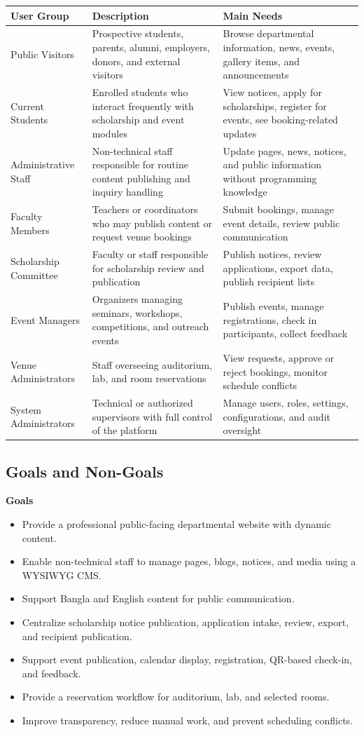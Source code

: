 \documentclass[12pt,a4paper]{article}
\newcommand{\thead}[1]{\textbf{\color{white}#1}}
\newcommand{\theadrow}{\rowcolor{headerblue}}
\begin{document}
\begin{longtable}{@{}L{3.6cm}L{5.2cm}L{5cm}@{}}
\theadrow \thead{User Group} & \thead{Description} & \thead{Main Needs} \\
\endhead
Public Visitors & Prospective students, parents, alumni, employers, donors, and external visitors & Browse departmental information, news, events, gallery items, and announcements \\
Current Students & Enrolled students who interact frequently with scholarship and event modules & View notices, apply for scholarships, register for events, see booking-related updates \\
Administrative Staff & Non-technical staff responsible for routine content publishing and inquiry handling & Update pages, news, notices, and public information without programming knowledge \\
Faculty Members & Teachers or coordinators who may publish content or request venue bookings & Submit bookings, manage event details, review public communication \\
Scholarship Committee & Faculty or staff responsible for scholarship review and publication & Publish notices, review applications, export data, publish recipient lists \\
Event Managers & Organizers managing seminars, workshops, competitions, and outreach events & Publish events, manage registrations, check in participants, collect feedback \\
Venue Administrators & Staff overseeing auditorium, lab, and room reservations & View requests, approve or reject bookings, monitor schedule conflicts \\
System Administrators & Technical or authorized supervisors with full control of the platform & Manage users, roles, settings, configurations, and audit oversight \\
\bottomrule
\end{longtable}

\subsection{Goals and Non-Goals}

\textbf{Goals}
\begin{itemize}[nosep]
\item Provide a professional public-facing departmental website with dynamic content.
\item Enable non-technical staff to manage pages, blogs, notices, and media using a WYSIWYG CMS.
\item Support Bangla and English content for public communication.
\item Centralize scholarship notice publication, application intake, review, export, and recipient publication.
\item Support event publication, calendar display, registration, QR-based check-in, and feedback.
\item Provide a reservation workflow for auditorium, lab, and selected rooms.
\item Improve transparency, reduce manual work, and prevent scheduling conflicts.
\end{itemize}
\end{document}
